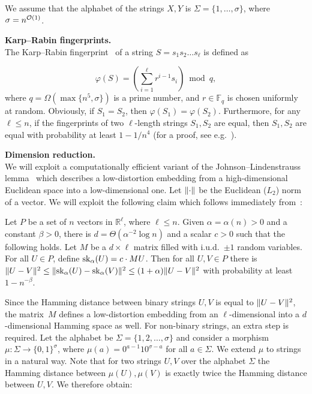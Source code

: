We assume that the alphabet of the strings $X, Y$ is $\Sigma = \{1,\ldots,\sigma\}$, where $\sigma = n^{\mathcal{O}(1)}$.


\noindent\textbf{Karp--Rabin fingerprints. }\\
\noindent The Karp--Rabin fingerprint~\cite{KRfingerprint} of a string $S = s_1 s_2 \dots s_\ell$ is defined as

$$\varphi(S) = \left(\sum_{i = 1}^{\ell} r^{i-1} s_i\right) \bmod q,$$ 
%
where $q = \Omega(\max\{n^5, \sigma\})$ is a prime number, and $r \in \mathbb{F}_q$ is chosen uniformly at random.  Obviously, if $S_1 = S_2$, then $\varphi(S_1) = \varphi(S_2)$. Furthermore, for any $\ell \le n$, if the fingerprints of two $\ell$-length strings $S_1, S_2$ are equal, then $S_1, S_2$ are equal with probability at least $1-1/n^4$ (for a proof, see e.g.~\cite{Porat:09}).


\noindent\textbf{Dimension reduction.}\\
\noindent We will exploit a computationally efficient variant of the Johnson--Lindenstrauss lemma~\cite{MR737400} which describes a low-distortion embedding from a high-dimensional Euclidean space into a low-dimensional one. Let $\lVert\cdot\rVert$ be the Euclidean ($L_2$) norm of a vector. We will exploit the following claim which follows immediately from~\cite[Theorem 1.1]{ACHLIOPTAS2003671}:
 
\begin{lemma}\label{lm:dim_reduction}
Let $P$ be a set of $n$ vectors in $\mathbb{R}^{\ell}$, where $\ell \le n$. Given $\alpha = \alpha(n) > 0$ and a constant $\beta > 0$, there is $d = \Theta(\alpha^{-2}\log n)$ and a scalar $c > 0$ such that the following holds. Let $M$ be a $d \times \ell$ matrix filled with i.u.d.\ $\pm1$ random variables. For all $U \in P$, define $\mathrm{sk}_\alpha (U) = c \cdot M U$. Then for all $U,V \in P$ there is $\lVert U-V\rVert^2 \leq \lVert\mathrm{sk}_\alpha(U)-\mathrm{sk}_\alpha(V)\rVert^2 \leq (1+\alpha) \lVert U-V\rVert^2$ with probability at least $1- n^{-\beta}$. 
\end{lemma}

Since the Hamming distance between binary strings $U, V$ is equal to $\lVert U-V\rVert^2$, the matrix~$M$ defines a low-distortion embedding from an $\ell$-dimensional into a $d$-dimensional Hamming space as well. For non-binary strings, an extra step is required. Let the alphabet be $\Sigma = \{1, 2, \ldots, \sigma\}$ and consider a morphism $\mu : \Sigma \rightarrow \{0,1\}^\sigma$, where $\mu(a) = 0^{a-1} 1 0^{\sigma-a}$ for all $a \in \Sigma$. We extend $\mu$ to strings in a natural way. Note that for two strings $U, V$ over the alphabet $\Sigma$ the Hamming distance between $\mu(U), \mu(V)$ is exactly twice the Hamming distance between $U, V$. We therefore obtain:

